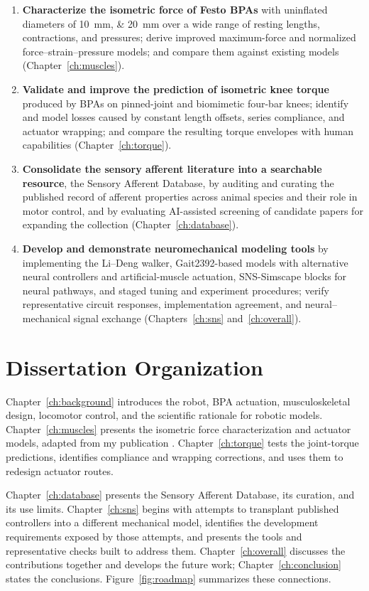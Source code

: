 \begin{enumerate}
    \item \textbf{Characterize the isometric force of Festo BPAs} with uninflated diameters of \qtylist{10;20}{\mm} over a wide range of resting lengths, contractions, and pressures; derive improved maximum-force and normalized force--strain--pressure models; and compare them against existing models (Chapter~\ref{ch:muscles}).
    \item \textbf{Validate and improve the prediction of isometric knee torque} produced by BPAs on pinned-joint and biomimetic four-bar knees; identify and model losses caused by constant length offsets, series compliance, and actuator wrapping; and compare the resulting torque envelopes with human capabilities (Chapter~\ref{ch:torque}).
    \item \textbf{Consolidate the sensory afferent literature into a searchable resource}, the Sensory Afferent Database, by auditing and curating the published record of afferent properties across animal species and their role in motor control, and by evaluating AI-assisted screening of candidate papers for expanding the collection (Chapter~\ref{ch:database}).
\item \textbf{Develop and demonstrate neuromechanical modeling tools} by implementing the Li--Deng walker, Gait2392-based models with alternative neural controllers and artificial-muscle actuation, SNS-Simscape blocks for neural pathways, and staged tuning and experiment procedures; verify representative circuit responses, implementation agreement, and neural--mechanical signal exchange (Chapters~\ref{ch:sns} and~\ref{ch:overall}).
\end{enumerate}

\section{Dissertation Organization}\label{sec:organization}

Chapter~\ref{ch:background} introduces the robot, BPA actuation, musculoskeletal design, locomotor control, and the scientific rationale for robotic models. Chapter~\ref{ch:muscles} presents the isometric force characterization and actuator models, adapted from my publication \citep{bolen_2026}. Chapter~\ref{ch:torque} tests the joint-torque predictions, identifies compliance and wrapping corrections, and uses them to redesign actuator routes.

Chapter~\ref{ch:database} presents the Sensory Afferent Database, its curation, and its use limits. Chapter~\ref{ch:sns} begins with attempts to transplant published controllers into a different mechanical model, identifies the development requirements exposed by those attempts, and presents the tools and representative checks built to address them. Chapter~\ref{ch:overall} discusses the contributions together and develops the future work; Chapter~\ref{ch:conclusion} states the conclusions. Figure~\ref{fig:roadmap} summarizes these connections.

